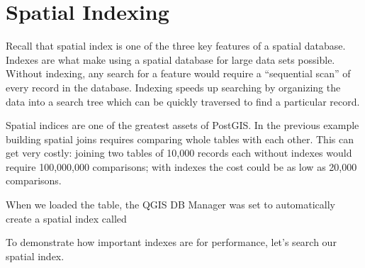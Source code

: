 \documentclass[a4paper,11pt,english]{sphinxmanual}
\begin{document}
\begin{itemize}
\begin{sphinxVerbatim}[commandchars=\\\{\}]
               
     
     
\end{sphinxVerbatim}

\end{itemize}


\section{Spatial Indexing}
\label{\detokenize{basic:spatial-indexing}}\label{\detokenize{basic:indexing}}
Recall that spatial index is one of the three key features of a spatial database. Indexes are what make using a spatial database for large data sets possible. Without indexing, any search for a feature would require a “sequential scan” of every record in the database. Indexing speeds up searching by organizing the data into a search tree which can be quickly traversed to find a particular record.

Spatial indices are one of the greatest assets of PostGIS.  In the previous example building spatial joins requires comparing whole tables with each other. This can get very costly: joining two tables of 10,000 records each without indexes would require 100,000,000 comparisons; with indexes the cost could be as low as 20,000 comparisons.

When we loaded the  table, the QGIS DB Manager was set to automatically create a spatial index called 

To demonstrate how important indexes are for performance, let’s search   our spatial index.
\end{document}
